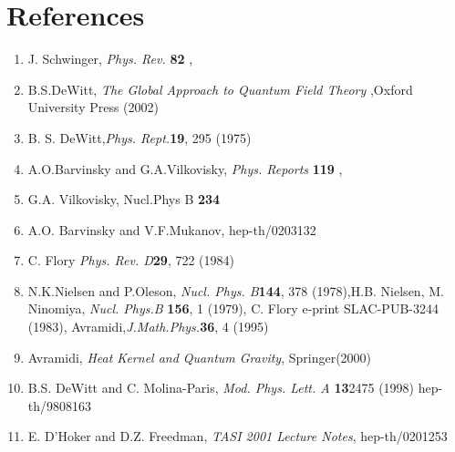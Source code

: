 \documentclass[a4paper,12 pt]{article}
\begin{document}
\section{References}
\begin{enumerate}
\item J. Schwinger, \emph{Phys. Rev. }\textbf{ 82 }, \coordHE{}
\item B.S.DeWitt, \emph{The Global Approach to Quantum Field
Theory} ,Oxford University Press (2002) \item B. S.
DeWitt,\emph{Phys. Rept.}\textbf{19}, 295  (1975) \item
A.O.Barvinsky and G.A.Vilkovisky, \emph{Phys. Reports} \textbf{119
}, \coordHE{} \item G.A. Vilkovisky, Nucl.Phys B \textbf{234}
\coordHE{}
 \item A.O. Barvinsky and
V.F.Mukanov, hep-th/0203132 \item C. Flory \emph{Phys. Rev.
D}\textbf{29}, 722 (1984) \item N.K.Nielsen and P.Oleson,
\emph{Nucl. Phys. B}\textbf{144}, 378 (1978),H.B. Nielsen, M.
Ninomiya, \emph{Nucl. Phys.B} \textbf{156}, 1 (1979), C. Flory
e-print SLAC-PUB-3244 (1983),
Avramidi,\emph{J.Math.Phys.}\textbf{36}, 4 (1995) \item
 Avramidi,
\emph{Heat Kernel and Quantum Gravity}, Springer(2000)
 \item B.S.
DeWitt and C. Molina-Paris, \emph{Mod. Phys. Lett. A}
\textbf{13}2475 (1998) hep-th/9808163
 \item E. D'Hoker and D.Z. Freedman, \emph{TASI 2001 Lecture Notes}, hep-th/0201253
\end{enumerate}
\end{document}

